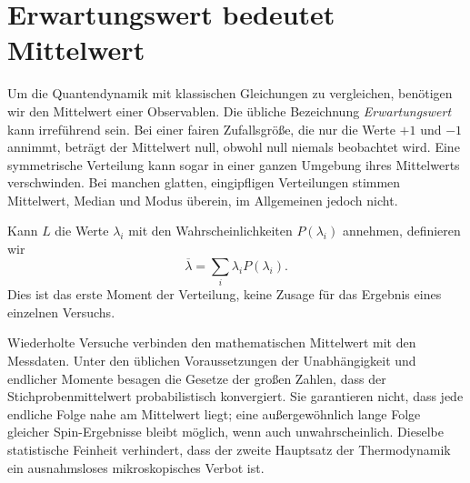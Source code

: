 \section{Erwartungswert bedeutet Mittelwert}

Um die Quantendynamik mit klassischen Gleichungen zu vergleichen, benötigen wir den Mittelwert einer Observablen. Die übliche Bezeichnung \emph{Erwartungswert} kann irreführend sein. Bei einer fairen Zufallsgröße, die nur die Werte \(+1\) und \(-1\) annimmt, beträgt der Mittelwert null, obwohl null niemals beobachtet wird. Eine symmetrische Verteilung kann sogar in einer ganzen Umgebung ihres Mittelwerts verschwinden. Bei manchen glatten, eingipfligen Verteilungen stimmen Mittelwert, Median und Modus überein, im Allgemeinen jedoch nicht.

Kann \(L\) die Werte \(\lambda_i\) mit den Wahrscheinlichkeiten \(P(\lambda_i)\) annehmen, definieren wir
\begin{equation}
\overline{\lambda}=\sum_i\lambda_iP(\lambda_i).
\label{eq:l4-probability-average}
\end{equation}
Dies ist das erste Moment der Verteilung, keine Zusage für das Ergebnis eines einzelnen Versuchs.

\begin{classroomqa}\end{classroomqa}

Wiederholte Versuche verbinden den mathematischen Mittelwert mit den Messdaten. Unter den üblichen Voraussetzungen der Unabhängigkeit und endlicher Momente besagen die Gesetze der großen Zahlen, dass der Stichprobenmittelwert probabilistisch konvergiert. Sie garantieren nicht, dass jede endliche Folge nahe am Mittelwert liegt; eine außergewöhnlich lange Folge gleicher Spin-Ergebnisse bleibt möglich, wenn auch unwahrscheinlich. Dieselbe statistische Feinheit verhindert, dass der zweite Hauptsatz der Thermodynamik ein ausnahmsloses mikroskopisches Verbot ist.

\begin{classroomqa}\end{classroomqa}

